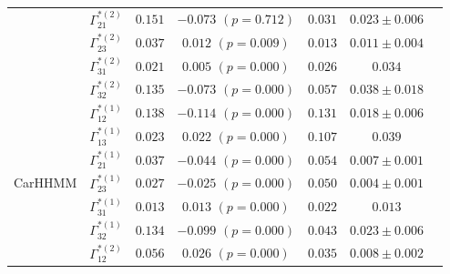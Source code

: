 \documentclass{article}
\begin{document}
\begin{center}
{\begin{tabular}{ccccccc}
                             & $\Gamma^{*(2)}_{21}$          & $0.151$                         & $-0.073$ $(p=0.712)$        & $0.031$                           & $0.023 \pm 0.006$                             \\
                             & $\Gamma^{*(2)}_{23}$          & $0.037$                         & $0.012$ $(p=0.009)$        & $0.013$                           & $0.011 \pm 0.004$                             \\
                             & $\Gamma^{*(2)}_{31}$          & $0.021$                         & $0.005$ $(p=0.000)$        & $0.026$                           & $0.034  $                             \\
                             & $\Gamma^{*(2)}_{32}$          & $0.135$                         & $-0.073$ $(p=0.000)$        & $0.057$                           & $0.038 \pm 0.018$                             \\ \hline
\multirow{12}{*}{CarHHMM}    & $\Gamma^{*(1)}_{12}$          & $0.138$                         & $-0.114$ $(p=0.000)$        & $0.131$                           & $0.018 \pm 0.006$                             \\
                             & $\Gamma^{*(1)}_{13}$          & $0.023$                         & $0.022$ $(p=0.000)$        & $0.107$                           & $0.039  $                             \\
                             & $\Gamma^{*(1)}_{21}$          & $0.037$                         & $-0.044$ $(p=0.000)$        & $0.054$                           & $0.007 \pm 0.001$                             \\
                             & $\Gamma^{*(1)}_{23}$          & $0.027$                         & $-0.025$ $(p=0.000)$        & $0.050$                           & $0.004 \pm 0.001$                             \\
                             & $\Gamma^{*(1)}_{31}$          & $0.013$                         & $0.013$ $(p=0.000)$        & $0.022$                           & $0.013  $                             \\
                             & $\Gamma^{*(1)}_{32}$          & $0.134$                         & $-0.099$ $(p=0.000)$        & $0.043$                           & $0.023 \pm 0.006$                             \\
                             & $\Gamma^{*(2)}_{12}$          & $0.056$                         & $0.026$ $(p=0.000)$        & $0.035$                           & $0.008 \pm 0.002$                             \\

\end{tabular}}
\end{center}
\end{document}
